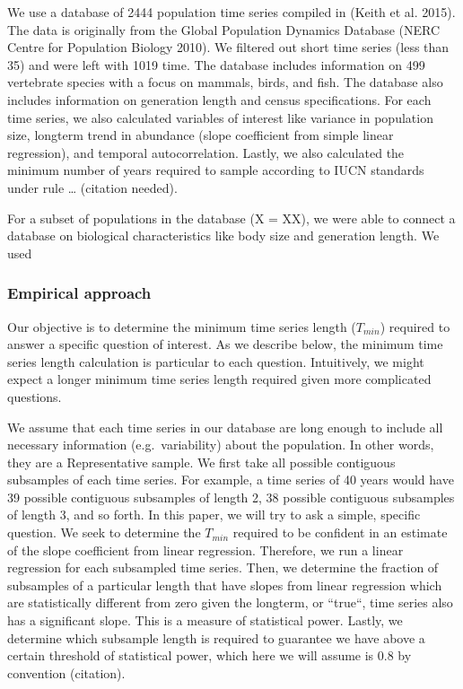 \documentclass[11pt,]{article}
\begin{document}
We use a database of 2444 population time series compiled in (Keith et
al. 2015). The data is originally from the Global Population Dynamics
Database (NERC Centre for Population Biology 2010). We filtered out
short time series (less than 35) and were left with 1019 time. The
database includes information on 499 vertebrate species with a focus on
mammals, birds, and fish. The database also includes information on
generation length and census specifications. For each time series, we
also calculated variables of interest like variance in population size,
longterm trend in abundance (slope coefficient from simple linear
regression), and temporal autocorrelation. Lastly, we also calculated
the minimum number of years required to sample according to IUCN
standards under rule \ldots{} (citation needed).

For a subset of populations in the database (X = XX), we were able to
connect a database on biological characteristics like body size and
generation length. We used

\subsubsection{Empirical approach}\label{empirical-approach}

Our objective is to determine the minimum time series length
(\(T_{min}\)) required to answer a specific question of interest. As we
describe below, the minimum time series length calculation is particular
to each question. Intuitively, we might expect a longer minimum time
series length required given more complicated questions.

We assume that each time series in our database are long enough to
include all necessary information (e.g.~variability) about the
population. In other words, they are a Representative sample. We first
take all possible contiguous subsamples of each time series. For
example, a time series of 40 years would have 39 possible contiguous
subsamples of length 2, 38 possible contiguous subsamples of length 3,
and so forth. In this paper, we will try to ask a simple, specific
question. We seek to determine the \(T_{min}\) required to be confident
in an estimate of the slope coefficient from linear regression.
Therefore, we run a linear regression for each subsampled time series.
Then, we determine the fraction of subsamples of a particular length
that have slopes from linear regression which are statistically
different from zero given the longterm, or ``true``, time series also
has a significant slope. This is a measure of statistical power. Lastly,
we determine which subsample length is required to guarantee we have
above a certain threshold of statistical power, which here we will
assume is 0.8 by convention (citation).
\end{document}
